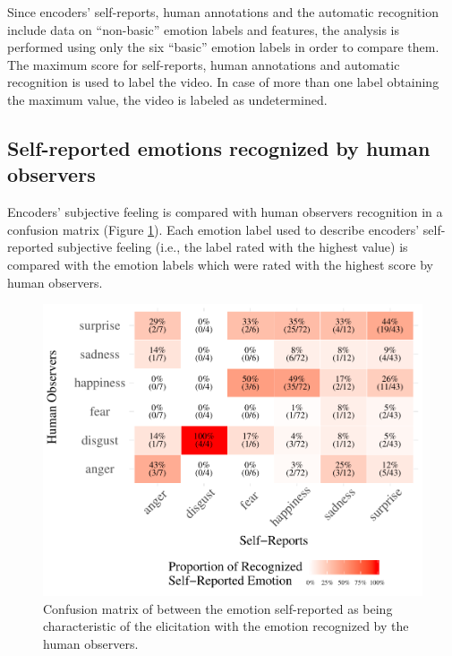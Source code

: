 \documentclass[conference,final,]{IEEEtran}
\makeatletter
\def\maxwidth{\ifdim\Gin@nat@width>\linewidth\linewidth
\else\Gin@nat@width\fi}
\let\Oldincludegraphics\includegraphics
\renewcommand{\includegraphics}[1]{\Oldincludegraphics[width=\maxwidth]{#1}}
\makeatother
\begin{document}
Since encoders' self-reports, human annotations and the automatic
recognition include data on ``non-basic'' emotion labels and features,
the analysis is performed using only the six ``basic'' emotion labels in
order to compare them. The maximum score for self-reports, human
annotations and automatic recognition is used to label the video. In
case of more than one label obtaining the maximum value, the video is
labeled as undetermined.

\hypertarget{self-reported-emotions-recognized-by-human-observers}{%
\subsection{Self-reported emotions recognized by human
observers}\label{self-reported-emotions-recognized-by-human-observers}}

Encoders' subjective feeling is compared with human observers
recognition in a confusion matrix (Figure
\ref{fig:confusionMatrix_sr_hr}). Each emotion label used to describe
encoders' self-reported subjective feeling (i.e., the label rated with
the highest value) is compared with the emotion labels which were rated
with the highest score by human observers.

\begin{figure}
\centering
\includegraphics{ACII_2019_paper_files/figure-latex/confusionMatrix_sr_hr-1.pdf}
\caption{\label{fig:confusionMatrix_sr_hr}Confusion matrix of between
the emotion self-reported as being characteristic of the elicitation
with the emotion recognized by the human observers.}
\end{figure}
\end{document}
